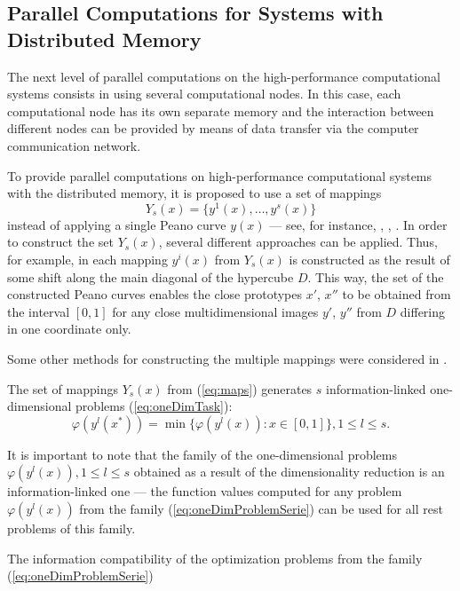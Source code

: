 \documentclass{aims}
\theoremstyle{definition}
\begin{document}
\subsection{Parallel Computations for Systems with Distributed Memory}
\label{subsec:distribpar}
The next level of parallel computations on the high-performance computational systems
consists in using several computational nodes. In this case, each computational node has
its own separate memory and the interaction between different nodes can be provided by
means of data transfer via the computer communication network.
\par
To provide parallel computations on high-performance computational systems with the distributed memory, it is proposed to use a set of mappings
\begin{equation}
  \label{eq:maps}
Y_s(x)=\{y^1(x),\dots,y^s(x)\}
\end{equation}
instead of applying a single Peano curve \(y(x)\) --- see, for instance,
\cite{strongin1992}, \cite{stronginGergelBarkalovParGO}, \cite{strSergGO}.
In order to construct the set \(Y_s(x)\), several different approaches can be applied.
Thus, for example, in \cite{strongin1992} each mapping \(y^i(x)\) from \(Y_s(x)\) is constructed
as the result of some shift along the main diagonal of the hypercube \(D\). This way,
the set of the constructed Peano curves enables the close prototypes \(x'\), \(x''\)
to be obtained from the interval \([0, 1]\) for any close multidimensional images
\(y'\), \(y''\) from \(D\) differing in one coordinate only.
\par
Some other methods for constructing the multiple mappings were considered in \cite{stronginGergelBarkalovParGO}.
\par
The set of mappings \(Y_s(x)\) from (\ref{eq:maps}) generates \(s\) information-linked one-dimensional
problems (\ref{eq:oneDimTask}):
\begin{equation}
  \label{eq:oneDimProblemSerie}
  \varphi(y^l(x^*))=\min\{\varphi(y^l(x)):x\in [0,1]\},1\leq l\leq s.
\end{equation}
\par
It is important to note that the family of the one-dimensional problems
\(\varphi(y^l(x)),1 \leq l \leq s\) obtained as a result of the dimensionality
reduction is an information-linked one --- the function values computed for any
problem \(\varphi(y^l(x))\) from the family (\ref{eq:oneDimProblemSerie}) can be used for all rest problems of this family.
\par
The information compatibility of the optimization problems from the family (\ref{eq:oneDimProblemSerie})
\end{document}
